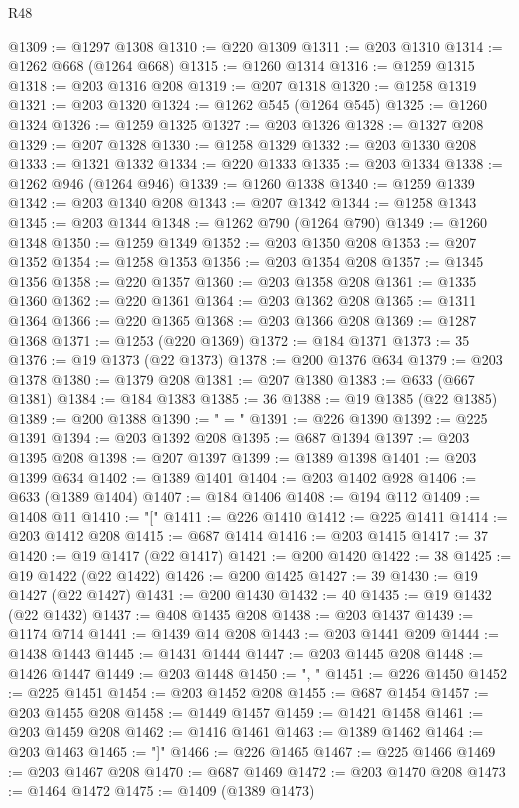 \begin{lexlean}{R48}
\begin{coremodule}
@1309 := @1297 @1308
@1310 := @220 @1309
@1311 := @203 @1310
@1314 := @1262 @668 (@1264 @668)
@1315 := @1260 @1314
@1316 := @1259 @1315
@1318 := @203 @1316 @208
@1319 := @207 @1318
@1320 := @1258 @1319
@1321 := @203 @1320
@1324 := @1262 @545 (@1264 @545)
@1325 := @1260 @1324
@1326 := @1259 @1325
@1327 := @203 @1326
@1328 := @1327 @208
@1329 := @207 @1328
@1330 := @1258 @1329
@1332 := @203 @1330 @208
@1333 := @1321 @1332
@1334 := @220 @1333
@1335 := @203 @1334
@1338 := @1262 @946 (@1264 @946)
@1339 := @1260 @1338
@1340 := @1259 @1339
@1342 := @203 @1340 @208
@1343 := @207 @1342
@1344 := @1258 @1343
@1345 := @203 @1344
@1348 := @1262 @790 (@1264 @790)
@1349 := @1260 @1348
@1350 := @1259 @1349
@1352 := @203 @1350 @208
@1353 := @207 @1352
@1354 := @1258 @1353
@1356 := @203 @1354 @208
@1357 := @1345 @1356
@1358 := @220 @1357
@1360 := @203 @1358 @208
@1361 := @1335 @1360
@1362 := @220 @1361
@1364 := @203 @1362 @208
@1365 := @1311 @1364
@1366 := @220 @1365
@1368 := @203 @1366 @208
@1369 := @1287 @1368
@1371 := @1253 (@220 @1369)
@1372 := @184 @1371
@1373 := 35
@1376 := @19 @1373 (@22 @1373)
@1378 := @200 @1376 @634
@1379 := @203 @1378
@1380 := @1379 @208
@1381 := @207 @1380
@1383 := @633 (@667 @1381)
@1384 := @184 @1383
@1385 := 36
@1388 := @19 @1385 (@22 @1385)
@1389 := @200 @1388
@1390 := " = "
@1391 := @226 @1390
@1392 := @225 @1391
@1394 := @203 @1392 @208
@1395 := @687 @1394
@1397 := @203 @1395 @208
@1398 := @207 @1397
@1399 := @1389 @1398
@1401 := @203 @1399 @634
@1402 := @1389 @1401
@1404 := @203 @1402 @928
@1406 := @633 (@1389 @1404)
@1407 := @184 @1406
@1408 := @194 @112
@1409 := @1408 @11
@1410 := "["
@1411 := @226 @1410
@1412 := @225 @1411
@1414 := @203 @1412 @208
@1415 := @687 @1414
@1416 := @203 @1415
@1417 := 37
@1420 := @19 @1417 (@22 @1417)
@1421 := @200 @1420
@1422 := 38
@1425 := @19 @1422 (@22 @1422)
@1426 := @200 @1425
@1427 := 39
@1430 := @19 @1427 (@22 @1427)
@1431 := @200 @1430
@1432 := 40
@1435 := @19 @1432 (@22 @1432)
@1437 := @408 @1435 @208
@1438 := @203 @1437
@1439 := @1174 @714
@1441 := @1439 @14 @208
@1443 := @203 @1441 @209
@1444 := @1438 @1443
@1445 := @1431 @1444
@1447 := @203 @1445 @208
@1448 := @1426 @1447
@1449 := @203 @1448
@1450 := ", "
@1451 := @226 @1450
@1452 := @225 @1451
@1454 := @203 @1452 @208
@1455 := @687 @1454
@1457 := @203 @1455 @208
@1458 := @1449 @1457
@1459 := @1421 @1458
@1461 := @203 @1459 @208
@1462 := @1416 @1461
@1463 := @1389 @1462
@1464 := @203 @1463
@1465 := "]"
@1466 := @226 @1465
@1467 := @225 @1466
@1469 := @203 @1467 @208
@1470 := @687 @1469
@1472 := @203 @1470 @208
@1473 := @1464 @1472
@1475 := @1409 (@1389 @1473)

\end{coremodule}
\end{lexlean}

